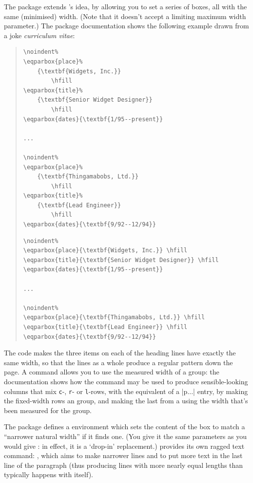 The  package extends 's idea, by
allowing you to set a series of boxes, all with the same (minimised)
width.  (Note that it doesn't accept a limiting maximum width
parameter.)  The package documentation shows the following example
drawn from a joke \emph{curriculum vitae}:
\begin{quote}
\begin{narrowversion}
\begin{verbatim}
\noindent%
\eqparbox{place}%
    {\textbf{Widgets, Inc.}}
        \hfill
\eqparbox{title}%
    {\textbf{Senior Widget Designer}}
        \hfill
\eqparbox{dates}{\textbf{1/95--present}}

...

\noindent%
\eqparbox{place}%
    {\textbf{Thingamabobs, Ltd.}}
        \hfill
\eqparbox{title}%
    {\textbf{Lead Engineer}}
        \hfill
\eqparbox{dates}{\textbf{9/92--12/94}}
\end{verbatim}
\end{narrowversion}
\begin{wideversion}
\begin{verbatim}
\noindent%
\eqparbox{place}{\textbf{Widgets, Inc.}} \hfill
\eqparbox{title}{\textbf{Senior Widget Designer}} \hfill
\eqparbox{dates}{\textbf{1/95--present}}

...

\noindent%
\eqparbox{place}{\textbf{Thingamabobs, Ltd.}} \hfill
\eqparbox{title}{\textbf{Lead Engineer}} \hfill
\eqparbox{dates}{\textbf{9/92--12/94}}
\end{verbatim}
\end{wideversion}
\end{quote}
The code makes the three items on each of the heading lines have
exactly the same width, so that the lines as a whole produce a regular
pattern down the page.  A command  allows you to use
the measured width of a group: the documentation shows how the command
may be used to produce sensible-looking columns that mix \texttt{c}-,
\texttt{r}- or \texttt{l}-rows, with the equivalent of a |p{...}|
entry, by making the fixed-width rows an  group, and
making the last from a  using the width that's been
measured for the group.

The  package defines a 
environment which sets the content of the box to match a ``narrower
natural width'' if it finds one.  (You give it the same parameters as
you would give : in effect, it is a `drop-in'
replacement.)   provides its own ragged text command:
, which aims to make narrower lines and to put more
text in the last line of the paragraph (thus producing lines with more
nearly equal lengths than typically happens with 
itself).

